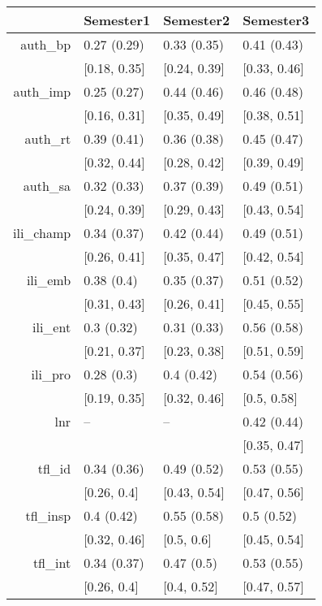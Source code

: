 \begin{table}[ht]
\centering
\begin{tabular}{rlll}
  \hline
 & Semester1 & Semester2 & Semester3 \\ 
  \hline
auth\_bp & 0.27 (0.29) & 0.33 (0.35) & 0.41 (0.43) \\ 
   & [0.18, 0.35] & [0.24, 0.39] & [0.33, 0.46] \\ 
  auth\_imp & 0.25 (0.27) & 0.44 (0.46) & 0.46 (0.48) \\ 
     & [0.16, 0.31] & [0.35, 0.49] & [0.38, 0.51] \\ 
  auth\_rt & 0.39 (0.41) & 0.36 (0.38) & 0.45 (0.47) \\ 
       & [0.32, 0.44] & [0.28, 0.42] & [0.39, 0.49] \\ 
  auth\_sa & 0.32 (0.33) & 0.37 (0.39) & 0.49 (0.51) \\ 
         & [0.24, 0.39] & [0.29, 0.43] & [0.43, 0.54] \\ 
  ili\_champ & 0.34 (0.37) & 0.42 (0.44) & 0.49 (0.51) \\ 
           & [0.26, 0.41] & [0.35, 0.47] & [0.42, 0.54] \\ 
  ili\_emb & 0.38 (0.4) & 0.35 (0.37) & 0.51 (0.52) \\ 
             & [0.31, 0.43] & [0.26, 0.41] & [0.45, 0.55] \\ 
  ili\_ent & 0.3 (0.32) & 0.31 (0.33) & 0.56 (0.58) \\ 
               & [0.21, 0.37] & [0.23, 0.38] & [0.51, 0.59] \\ 
  ili\_pro & 0.28 (0.3) & 0.4 (0.42) & 0.54 (0.56) \\ 
                 & [0.19, 0.35] & [0.32, 0.46] & [0.5, 0.58] \\ 
  lnr & -- & -- & 0.42 (0.44) \\ 
                   &  &  & [0.35, 0.47] \\ 
  tfl\_id & 0.34 (0.36) & 0.49 (0.52) & 0.53 (0.55) \\ 
                     & [0.26, 0.4] & [0.43, 0.54] & [0.47, 0.56] \\ 
  tfl\_insp & 0.4 (0.42) & 0.55 (0.58) & 0.5 (0.52) \\ 
                       & [0.32, 0.46] & [0.5, 0.6] & [0.45, 0.54] \\ 
  tfl\_int & 0.34 (0.37) & 0.47 (0.5) & 0.53 (0.55) \\ 
                         & [0.26, 0.4] & [0.4, 0.52] & [0.47, 0.57] \\ 

\end{tabular}
\end{table}
